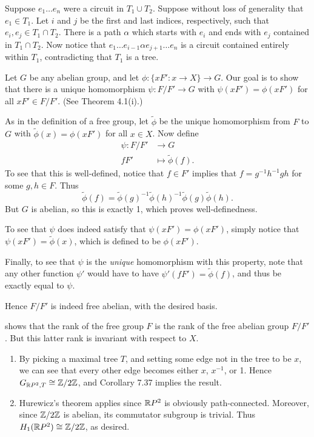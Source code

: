 \documentclass[../../solutions.tex]{subfiles}
\begin{document}
\begin{exercise} \leavevmode
Suppose $e_1\dots e_n$ were a circuit in $T_1\cup T_2$.
Suppose without loss of generality that $e_1\in T_1$.
Let $i$ and $j$ be the first and last indices, respectively, such that $e_i,e_j\in T_1\cap T_2$.
There is a path $\alpha$ which starts with $e_i$ and ends with $e_j$ contained in $T_1\cap T_2$.
Now notice that $e_1\dots e_{i-1}\alpha e_{j+1}\dots e_n$ is a circuit contained entirely within $T_1$, contradicting that $T_1$ is a tree.
\end{exercise}

\begin{exercise} \leavevmode
Let $G$ be any abelian group, and let $\phi:\{xF':x\to X\}\to G$.
Our goal is to show that there is a unique homomorphism $\psi:F/F'\to G$ with $\psi(xF')=\phi(xF')$ for all $xF'\in F/F'$.
(See Theorem 4.1(i).)

As in the definition of a free group, let $\tilde\phi$ be the unique homomorphism from $F$ to $G$ with $\tilde\phi(x)=\phi(xF')$ for all $x\in X$.
Now define
\begin{align*}
\psi:F/F'&\to G\\ fF'&\mapsto\tilde\phi(f).
\end{align*}
To see that this is well-defined, notice that $f\in F'$ implies that $f=g^{-1}h^{-1}gh$ for some $g,h\in F$.
Thus
\[\tilde\phi(f)=\tilde\phi(g)^{-1}\tilde\phi(h)^{-1}\tilde\phi(g)\tilde\phi(h).\]
But $G$ is abelian, so this is exactly 1, which proves well-definedness.

To see that $\psi$ does indeed satisfy that $\psi(xF')=\phi(xF')$, simply notice that $\psi(xF')=\tilde\phi(x)$, which is defined to be $\phi(xF')$.

Finally, to see that $\psi$ is the \textit{unique} homomorphism with this property, note that any other function $\psi'$ would have to have $\psi'(fF')=\tilde\phi(f)$, and thus be exactly equal to $\psi$.

Hence $F/F'$ is indeed free abelian, with the desired basis.
\end{exercise}

\begin{exercise} \leavevmode
{} shows that the rank of the free group $F$ is the rank of the free abelian group $F/F'$.
But this latter rank is invariant with respect to $X$.
\end{exercise}

\begin{exercise} \leavevmode
\begin{enumerate}
\item
By picking a maximal tree $T$, and setting some edge not in the tree to be $x$, we can see that every other edge becomes either $x$, $x^{-1}$, or 1.
Hence $G_{\mathbb{R} P^2,T}\cong\mathbb{Z}/2\mathbb{Z}$, and Corollary 7.37 implies the result.

\item
Hurewicz's theorem applies since $\mathbb{R} P^2$ is obviously path-connected.
Moreover, since $\mathbb{Z}/2\mathbb{Z}$ is abelian, its commutator subgroup is trivial.
Thus $H_1(\mathbb{R} P^2)\cong\mathbb{Z}/2\mathbb{Z}$, as desired.
\end{enumerate}
\end{exercise}
\end{document}
